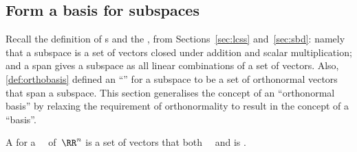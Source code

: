 \subsection{Form a basis for subspaces}


Recall the definition of s and the , from Sections~\ref{sec:lcss} and~\ref{sec:sbd}: namely that a subspace is a set of vectors closed under addition and scalar multiplication; and a span gives a subspace as all linear combinations of a set of vectors.
Also, \autoref{def:orthobasis} defined an ``'' for a subspace to be a set of orthonormal vectors that span a subspace.
This section generalises the concept of an ``orthonormal basis'' by relaxing the requirement of orthonormality to result in the concept of a ``basis''.


\begin{definition} \label{def:basis} 
A  for a ~\WW\ of~\(\RR^n\) is a set of  vectors that both ~\WW\ and is .
\end{definition}

